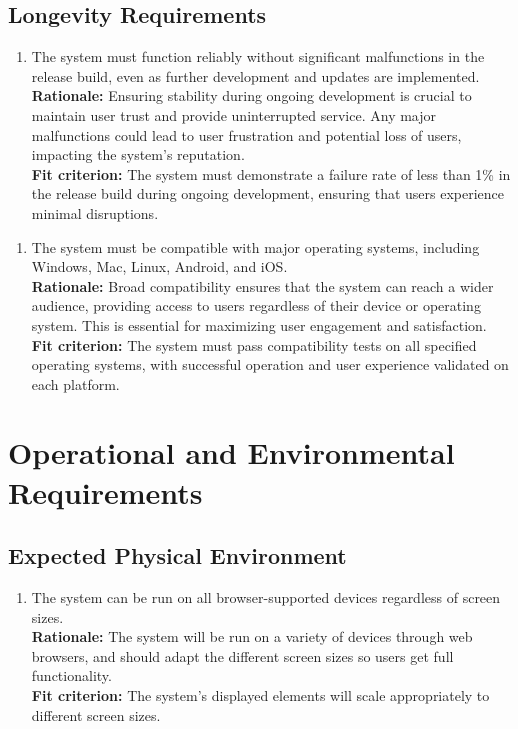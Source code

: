 \documentclass[12pt]{article}
\begin{document}
\subsection{Longevity Requirements}
\begin{enumerate}[{PR-LR}1. ]
  \item The system must function reliably without significant malfunctions in the release build, even as further development and updates are implemented.\\
  \textbf{Rationale: }Ensuring stability during ongoing development is crucial to maintain user trust and provide uninterrupted service. Any major malfunctions could lead to user frustration and potential loss of users, impacting the system's reputation.\\
  \textbf{Fit criterion: }The system must demonstrate a failure rate of less than 1\% in the release build during ongoing development, ensuring that users experience minimal disruptions.  
\end{enumerate}
\begin{enumerate}[{PR-LR}2. ]
  \item The system must be compatible with major operating systems, including Windows, Mac, Linux, Android, and iOS.\\
  \textbf{Rationale: }Broad compatibility ensures that the system can reach a wider audience, providing access to users regardless of their device or operating system. This is essential for maximizing user engagement and satisfaction.\\
  \textbf{Fit criterion: }The system must pass compatibility tests on all specified operating systems, with successful operation and user experience validated on each platform.  
\end{enumerate}

\section{Operational and Environmental Requirements}
\subsection{Expected Physical Environment}
\begin{enumerate}[{OE-EPE}1. ]
  \item The system can be run on all browser-supported devices regardless of screen sizes.\\
  \textbf{Rationale: }The system will be run on a variety of devices through web browsers, and should adapt the different screen sizes so users get full functionality.\\
  \textbf{Fit criterion: }The system's displayed elements will scale appropriately to different screen sizes.
\end{enumerate}
\end{document}
